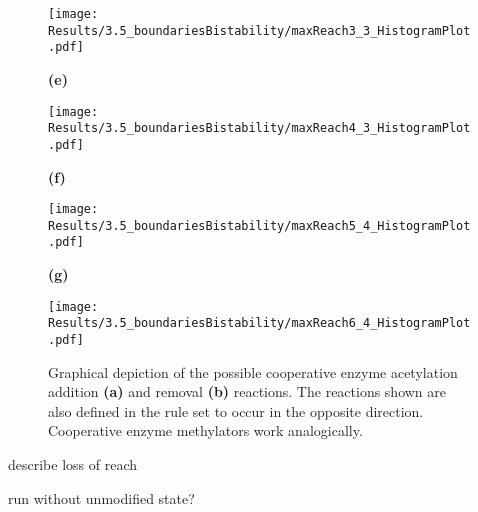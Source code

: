 \begin{figure}[htpb!]
\begin{minipage}{0.77\textwidth}
\begin{minipage}{0.1\textwidth}
                \end{minipage}
                \begin{minipage}{0.66\textwidth}
                    \texttt{[image: Results/3.5\_boundariesBistability/maxReach3\_3\_HistogramPlot.pdf]}
                \end{minipage}
            \end{minipage}
            \begin{minipage}{0.77\textwidth}
                \begin{minipage}{0.1\textwidth}
                    \caption*{\small \textbf{(e)}}
                    \label{}
                \end{minipage}
                \begin{minipage}{0.66\textwidth}
                    \texttt{[image: Results/3.5\_boundariesBistability/maxReach4\_3\_HistogramPlot.pdf]}
                    \label{}
                \end{minipage}
            \end{minipage}
            \begin{minipage}{0.77\textwidth}
                \begin{minipage}{0.1\textwidth}
                    \caption*{\small \textbf{(f)}}
                \end{minipage}
                \begin{minipage}{0.66\textwidth}
                    \texttt{[image: Results/3.5\_boundariesBistability/maxReach5\_4\_HistogramPlot.pdf]}
                \end{minipage}
            \end{minipage}
            \begin{minipage}{0.77\textwidth}
                \begin{minipage}{0.1\textwidth}
                    \caption*{\small \textbf{(g)}}
                \end{minipage}
                \begin{minipage}{0.66\textwidth}
                    \texttt{[image: Results/3.5\_boundariesBistability/maxReach6\_4\_HistogramPlot.pdf]}
                \end{minipage}
            \end{minipage}
            \caption{Graphical depiction of the possible cooperative enzyme acetylation addition \textbf{(a)} and removal \textbf{(b)} reactions. The reactions shown are also defined in the rule set to occur in the opposite direction. Cooperative enzyme methylators work analogically.}
            \label{img:linearEnzyme}
        \end{figure}
        \begin{itemize}
            {
                \color{red}
                \item describe loss of reach
                \item run without unmodified state?
            }
        \end{itemize}
    \newpage
